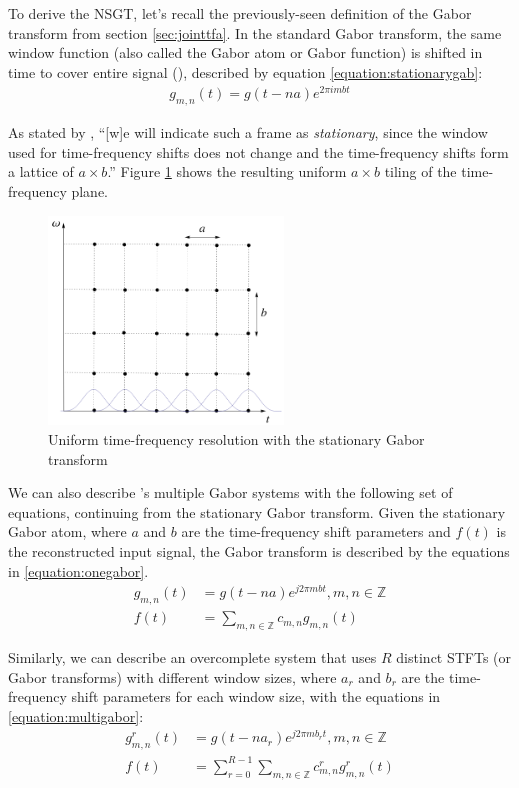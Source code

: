 \documentclass[report.tex]{subfiles}
\begin{document}
To derive the NSGT, let's recall the previously-seen definition of the Gabor transform from section \ref{sec:jointtfa}. In the standard Gabor transform, the same window function (also called the Gabor atom or Gabor function) is shifted in time to cover entire signal (\cite{adaptivecqt}), described by equation \ref{equation:stationarygab}:
\begin{align} \tag{10}\label{equation:stationarygab}
g_{m, n}(t) = g(t - na)e^{2\pi i m b t}
\end{align}

As stated by \textcite{adaptivecqt}, ``[w]e will indicate such a frame as \textit{stationary}, since the window used for time-frequency shifts does not change and the time-frequency shifts form a lattice of $a \times b$.'' Figure \ref{fig:uniformtflattice} shows the resulting uniform $a \times b$ tiling of the time-frequency plane.

\begin{figure}[ht]
	\centering
	\includegraphics[width=6.25cm]{./images-tftheory/stationarygabor.png}
	\caption{Uniform time-frequency resolution with the stationary Gabor transform}
	\label{fig:uniformtflattice}
\end{figure}

We can also describe \textcite{doerflerphd}'s multiple Gabor systems with the following set of equations, continuing from the stationary Gabor transform. Given the stationary Gabor atom, where $a$ and $b$ are the time-frequency shift parameters and $f(t)$ is the reconstructed input signal, the Gabor transform is described by the equations in \ref{equation:onegabor}.
\begin{align}
	\nonumber g_{m,n}(t) &= g(t - na)e^{j2\pi m b t}, m,n \in \mathbb{Z}\\
	\nonumber f(t) &= \sum_{m,n \in \mathbb{Z}}c_{m,n}g_{m,n}(t) \tag{12}\label{equation:onegabor}
\end{align}

Similarly, we can describe an overcomplete system that uses $R$ distinct STFTs (or Gabor transforms) with different window sizes, where $a_{r}$ and $b_{r}$ are the time-frequency shift parameters for each window size, with the equations in \ref{equation:multigabor}:
\begin{align}
	\nonumber g_{m,n}^{r}(t) &= g(t - na_{r})e^{j2\pi m b_{r} t}, m,n \in \mathbb{Z}\\
	\nonumber f(t) &= \sum_{r=0}^{R-1}\sum_{m,n \in \mathbb{Z}}c^{r}_{m,n}g^{r}_{m,n}(t) \tag{13}\label{equation:multigabor}
\end{align}
\end{document}
